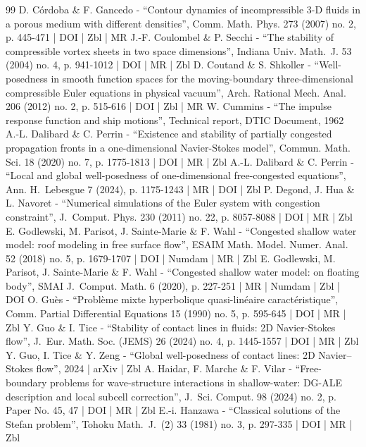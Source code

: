 \documentclass[10pt]{amsart}
\theoremstyle{definition}
\begin{document}
\begin{thebibliography}{99}
D. Córdoba \& F. Gancedo - “Contour dynamics of incompressible 3-D fluids in a porous medium with different densities”, Comm. Math. Phys. 273 (2007) no. 2, p. 445-471 | DOI | Zbl | MR
J.-F. Coulombel \& P. Secchi - “The stability of compressible vortex sheets in two space dimensions”, Indiana Univ. Math. J. 53 (2004) no. 4, p. 941-1012 | DOI | MR | Zbl
D. Coutand \& S. Shkoller - “Well-posedness in smooth function spaces for the moving-boundary three-dimensional compressible Euler equations in physical vacuum”, Arch. Rational Mech. Anal. 206 (2012) no. 2, p. 515-616 | DOI | Zbl | MR
W. Cummins - “The impulse response function and ship motions”, Technical report, DTIC Document, 1962
A.-L. Dalibard \& C. Perrin - “Existence and stability of partially congested propagation fronts in a one-dimensional Navier-Stokes model”, Commun. Math. Sci. 18 (2020) no. 7, p. 1775-1813 | DOI | MR | Zbl
A.-L. Dalibard \& C. Perrin - “Local and global well-posedness of one-dimensional free-congested equations”, Ann. H. Lebesgue 7 (2024), p. 1175-1243 | MR | DOI | Zbl
P. Degond, J. Hua \& L. Navoret - “Numerical simulations of the Euler system with congestion constraint”, J. Comput. Phys. 230 (2011) no. 22, p. 8057-8088 | DOI | MR | Zbl
E. Godlewski, M. Parisot, J. Sainte-Marie \& F. Wahl - “Congested shallow water model: roof modeling in free surface flow”, ESAIM Math. Model. Numer. Anal. 52 (2018) no. 5, p. 1679-1707 | DOI | Numdam | MR | Zbl
E. Godlewski, M. Parisot, J. Sainte-Marie \& F. Wahl - “Congested shallow water model: on floating body”, SMAI J. Comput. Math. 6 (2020), p. 227-251 | MR | Numdam | Zbl | DOI
O. Guès - “Problème mixte hyperbolique quasi-linéaire caractéristique”, Comm. Partial Differential Equations 15 (1990) no. 5, p. 595-645 | DOI | MR | Zbl
Y. Guo \& I. Tice - “Stability of contact lines in fluids: 2D Navier-Stokes flow”, J. Eur. Math. Soc. (JEMS) 26 (2024) no. 4, p. 1445-1557 | DOI | MR | Zbl
Y. Guo, I. Tice \& Y. Zeng - “Global well-posedness of contact lines: 2D Navier–Stokes flow”, 2024 | arXiv | Zbl
A. Haidar, F. Marche \& F. Vilar - “Free-boundary problems for wave-structure interactions in shallow-water: DG-ALE description and local subcell correction”, J. Sci. Comput. 98 (2024) no. 2, p. Paper No. 45, 47 | DOI | MR | Zbl
E.-i. Hanzawa - “Classical solutions of the Stefan problem”, Tohoku Math. J. (2) 33 (1981) no. 3, p. 297-335 | DOI | MR | Zbl

\end{thebibliography}
\end{document}
